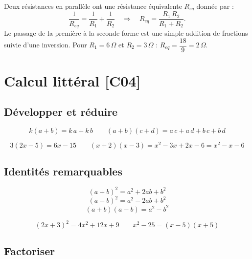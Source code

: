 \documentclass[a4paper,11pt]{article}
\begin{document}
\begin{appliindus}
Deux résistances en parallèle ont une résistance équivalente $R_{eq}$ donnée par :
\[
\frac{1}{R_{eq}} = \frac{1}{R_1} + \frac{1}{R_2}
\quad\Longrightarrow\quad
R_{eq} = \frac{R_1\,R_2}{R_1 + R_2}.
\]
Le passage de la première à la seconde forme est une simple addition de fractions suivie d'une inversion. Pour $R_1 = 6\,\Omega$ et $R_2 = 3\,\Omega$ : $R_{eq} = \dfrac{18}{9} = 2\,\Omega$.
\end{appliindus}

\newpage
\section{Calcul littéral \hfill {\normalsize\color{uimmred}[C04]}}

\subsection{Développer et réduire}

\begin{theoreme}[-- Distributivité]
\[
k(a + b) = k\,a + k\,b
\qquad
(a + b)(c + d) = a\,c + a\,d + b\,c + b\,d
\]
\end{theoreme}

\begin{exemple}
\[
3(2x - 5) = 6x - 15
\qquad
(x + 2)(x - 3) = x^2 - 3x + 2x - 6 = x^2 - x - 6
\]
\end{exemple}

\subsection{Identités remarquables}

\begin{theoreme}
\[
(a + b)^2 = a^2 + 2ab + b^2
\]
\[
(a - b)^2 = a^2 - 2ab + b^2
\]
\[
(a + b)(a - b) = a^2 - b^2
\]
\end{theoreme}

\begin{exemple}
\[
(2x + 3)^2 = 4x^2 + 12x + 9
\qquad
x^2 - 25 = (x - 5)(x + 5)
\]
\end{exemple}

\subsection{Factoriser}
\end{document}
